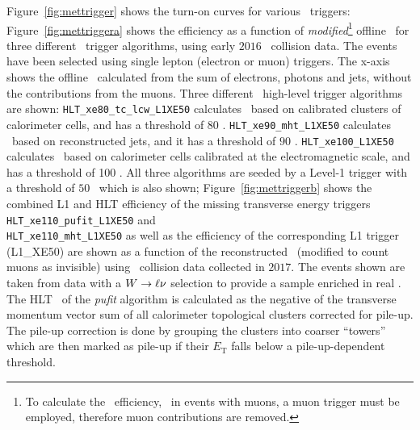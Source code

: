 					Figure~\ref{fig:mettrigger} shows the turn-on curves for various \met\ triggers: Figure~\ref{fig:mettriggera} shows the efficiency as a function of \textit{modified}\footnote{To calculate the \met\ efficiency, \eg\ in events with muons, a muon trigger must be employed, therefore muon contributions are removed.} offline \met\ for three different \met\ trigger algorithms, using early $2016$ \pp\ collision data. The events have been selected using single lepton (electron or muon) triggers. The x-axis shows the offline \met\ calculated from the sum of electrons, photons and jets, without the contributions from the muons. Three different \met\ high-level trigger algorithms are shown: \texttt{HLT\_xe80\_tc\_lcw\_L1XE50} calculates \met\ based on calibrated clusters of calorimeter cells, and has a threshold of 80 \GeV. \texttt{HLT\_xe90\_mht\_L1XE50} calculates \met\ based on reconstructed jets, and it has a threshold of $90$ \GeV. \texttt{HLT\_xe100\_L1XE50} calculates \met\ based on calorimeter cells calibrated at the electromagnetic scale, and has a threshold of 100 \GeV. All three algorithms are seeded by a Level-1 trigger with a threshold of $50$ \GeV\ which is also shown; Figure~\ref{fig:mettriggerb} shows the combined \ac{L1} and \ac{HLT} efficiency of the missing transverse energy triggers \texttt{HLT\_xe110\_pufit\_L1XE50} and \\ \texttt{HLT\_xe110\_mht\_L1XE50} as well as the efficiency of the corresponding \ac{L1} trigger (L1\_XE50) are shown as a function of the reconstructed \met\ (modified to count muons as invisible) using \pp\ collision data collected in $2017$. The events shown are taken from data with a $W \rightarrow \ell \nu$ selection to provide a sample enriched in real \met. The \ac{HLT} \met\ of the \textit{pufit} algorithm is calculated as the negative of the transverse momentum vector sum of all calorimeter topological clusters corrected for pile-up. The pile-up correction is done by grouping the clusters into coarser “towers” which are then marked as pile-up if their $E_\mathrm{T}$ falls below a pile-up-dependent threshold.

